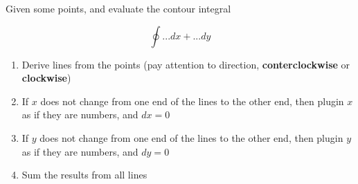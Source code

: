       Given some points, and evaluate the contour integral

      \begin{displaymath}
        \oint ... dx + ... dy
      \end{displaymath}

      \begin{enumerate}
        \item Derive lines from the points (pay attention to direction,
        \textbf{conterclockwise} or \textbf{clockwise})
        \item If $ x $ does not change from one end of the lines to the other
        end, then plugin $ x $ as if they are numbers, and $ dx = 0 $
        \item If $ y $ does not change from one end of the lines to the other
        end, then plugin $ y $ as if they are numbers, and $ dy = 0 $
        \item Sum the results from all lines
      \end{enumerate}